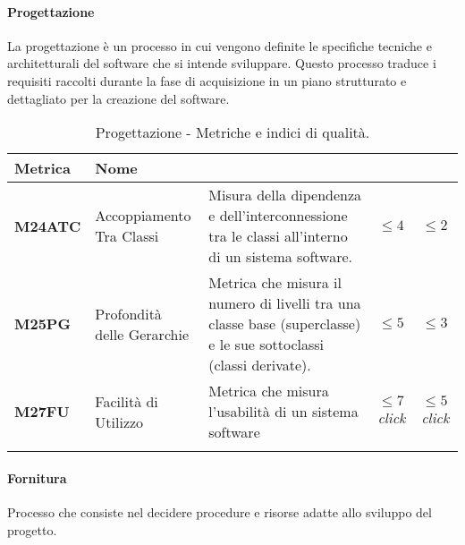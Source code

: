 \paragraph{Progettazione}
La progettazione è un processo in cui vengono definite le specifiche tecniche e architetturali del software che si intende sviluppare. Questo processo traduce i requisiti raccolti durante la fase di acquisizione in un piano strutturato e dettagliato per la creazione del software.

\hspace{1pt}
    \begin{longtable}{|C{1.5cm}|L{3cm}|L{4cm}|L{2.5cm}|L{2.5cm}|}
        \hline
        \textbf{Metrica} & \textbf{Nome} & \textbf{} & \textbf{} & \textbf{} \\
        \hline
        \textbf{M24ATC} & Accoppiamento Tra Classi &   Misura della dipendenza e dell'interconnessione tra le classi all'interno di un sistema software.   & $\leq 4$  & $\leq 2$ \\
        \hline
        \textbf{M25PG} & Profondità delle Gerarchie & Metrica che misura il numero di livelli tra una classe base (superclasse) e le sue sottoclassi (classi derivate). & $\leq 5$  & $\leq 3$ \\
        \hline
        \textbf{M27FU} & Facilità di Utilizzo & Metrica che misura l'usabilità di un sistema software & $\leq 7$ \textit{click}  & $\leq 5$ \textit{click} \\
        \hline
    \caption{Progettazione - Metriche e indici di qualità.}
    \label{tab:progettazione_progetto}
\end{longtable}

\paragraph{Fornitura}
Processo che consiste nel decidere procedure e risorse
adatte allo sviluppo del progetto.

